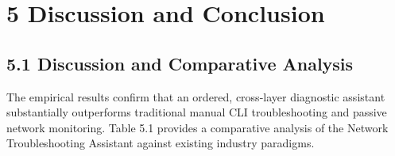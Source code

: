 \documentclass[
]{article}
\begin{document}
\newpage

\section{5 Discussion and Conclusion}\label{discussion-and-conclusion}

\subsection{5.1 Discussion and Comparative Analysis}\label{discussion-and-comparative-analysis}

The empirical results confirm that an ordered, cross-layer diagnostic assistant substantially outperforms traditional manual CLI troubleshooting and passive network monitoring. Table 5.1 provides a comparative analysis of the Network Troubleshooting Assistant against existing industry paradigms.
\end{document}
